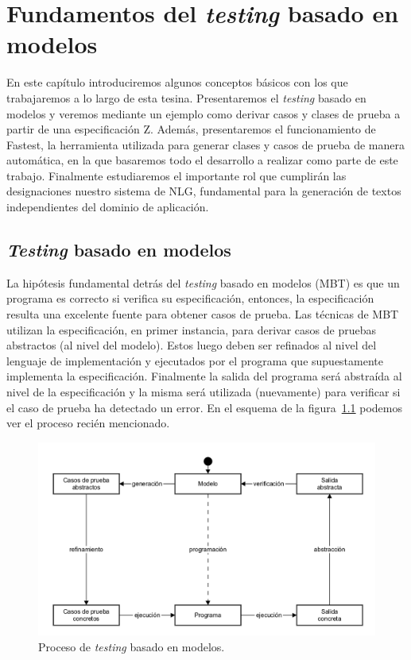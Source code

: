 \chapter{Fundamentos del \textit{testing} basado en modelos}
\label{cap:fundamentos}

En este capítulo introduciremos algunos conceptos básicos con los que trabajaremos a lo largo de esta tesina. Presentaremos el \textit{testing} basado en modelos y veremos mediante un ejemplo como derivar casos y clases de prueba a partir de una especificación Z. Además, presentaremos el funcionamiento de Fastest, la herramienta utilizada para generar clases y casos de prueba de manera automática, en la que basaremos todo el desarrollo a realizar como parte de este trabajo. Finalmente estudiaremos el importante rol que cumplirán las designaciones nuestro sistema de NLG, fundamental para la generación de textos independientes del dominio de aplicación.

\section{\textit{Testing} basado en modelos}

La hipótesis fundamental detrás del \textit{testing} basado en modelos (MBT) es que un programa es correcto si verifica su especificación, entonces, la especificación resulta una excelente fuente para obtener casos de prueba. Las técnicas de MBT utilizan la especificación, en primer instancia, para derivar casos de pruebas abstractos (al nivel del modelo). Estos luego deben ser refinados al nivel del lenguaje de implementación y ejecutados por el programa que supuestamente implementa la especificación. Finalmente la salida del programa será abstraída al nivel de la especificación y la misma será utilizada (nuevamente) para verificar si el caso de prueba ha detectado un error. En el esquema de la figura~\ref{fig:proc_mbt} podemos ver el proceso recién mencionado.

\begin{figure}[H]
\begin{center}
\includegraphics[scale=0.25]{img/proc_mbt.png}
\caption{Proceso de \textit{testing} basado en modelos.}
\label{fig:proc_mbt}
\end{center}
\end{figure}


